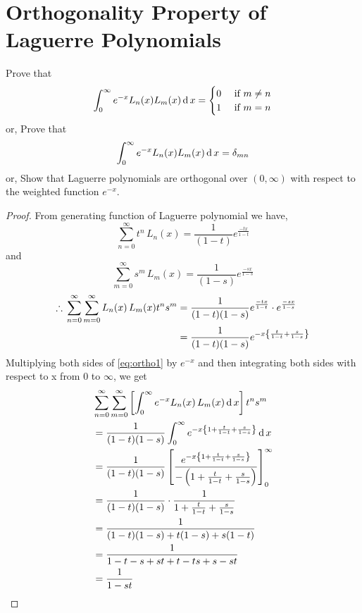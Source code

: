 \documentclass[../main-sheet.tex]{subfiles}
\begin{document}
\section{Orthogonality Property of Laguerre Polynomials}
\begin{prob}
    Prove that
    \[
        \int_0^\infty e^{-x}L_n(x)L_m(x)\,\mathrm{d}\, x=
        \begin{cases}
            0&\text{ if }m\neq n\\
            1&\text{ if }m= n
        \end{cases}
    \]
    or, Prove that
    \[
        \int_0^\infty e^{-x}L_n(x)L_m(x)\,\mathrm{d}\, x=\delta_{mn}
    \]
    or, Show that Laguerre polynomials are orthogonal over \( (0,\infty) \) with respect to the weighted function \( e^{-x} \).
\end{prob}
\begin{proof}
    From generating function of Laguerre polynomial we have,
    \[
        \sum_{n=0}^\infty t^n\,L_n(x)=\frac{1}{(1-t)}e^{\frac{-tx}{1-t}}
    \]
    and
    \[
        \sum_{m=0}^\infty s^m\,L_m(x)=\frac{1}{(1-s)}e^{\frac{-sx}{1-s}}
    \]
    \begin{align} 
        \therefore\,\sum_{n=0}^\infty\sum_{m=0}^\infty L_n(x)\,L_m(x)t^ns^m &= \frac{1}{(1-t)(1-s)}e^{\frac{-tx}{1-t}}\cdot e^{\frac{-sx}{1-s}}\notag\\
        &=\frac{1}{(1-t)(1-s)}e^{-x\left\{ \frac{t}{1-t}+\frac{s}{1-s}\right\}}\label{eq:ortho1}
    \end{align}
    Multiplying both sides of \eqref{eq:ortho1} by \( e^{-x} \) and then integrating both sides with respect to x from \( 0 \) to \( \infty \), we get
    \begin{align}
        &\sum_{n=0}^\infty\sum_{m=0}^\infty\left[\int_0^\infty e^{-x} L_n(x)\,L_m(x)\dx\right]t^ns^m\notag\\
        &= \frac{1}{(1-t)(1-s)}\int_0^\infty e^{-x\left\{ 1+\frac{t}{1-t}+\frac{s}{1-s}\right\}}\dx\notag\\
        &= \frac{1}{(1-t)(1-s)}\left[\frac{e^{-x\left\{ 1+\frac{t}{1-t}+\frac{s}{1-s}\right\}}}{-\left( 1+\frac{t}{1-t}+\frac{s}{1-s} \right)}\right]_0^\infty\notag\\
        &=\frac{1}{(1-t)(1-s)}\cdot\frac{1}{1+\frac{t}{1-t}+\frac{s}{1-s}}\notag\\
        &=\frac{1}{(1-t)(1-s)+t(1-s)+s(1-t)}\notag\\
        &=\frac{1}{1-t-s+st+t-ts+s-st}\notag\\
        &=\frac{1}{1-st}\notag\\

\end{align}
\end{proof}
\end{document}
